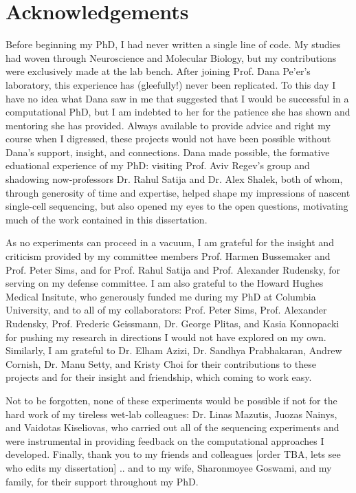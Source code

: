 
\cleartorecto %
\chapter{Acknowledgements} %
\thispagestyle{plain} %

Before beginning my PhD, I had never written a single line of code. 
My studies had woven through Neuroscience and Molecular Biology, but my contributions were exclusively made at the lab bench.  
After joining Prof. Dana Pe'er's laboratory, this experience has (gleefully!) never been replicated. 
To this day I have no idea what Dana saw in me that suggested that I would be successful in a computational PhD, but I am indebted to her for the patience she has shown and mentoring she has provided. 
Always available to provide advice and right my course when I digressed, these projects would not have been possible without Dana's support, insight, and connections.
Dana made possible, the formative eduational experience of my PhD: visiting Prof. Aviv Regev's group and shadowing now-professors Dr. Rahul Satija and Dr. Alex Shalek, both of whom, through generosity of time and expertise, helped shape my impressions of nascent single-cell sequencing, but also opened my eyes to the open questions, motivating much of the work contained in this dissertation. 

As no experiments can proceed in a vacuum, I am grateful for the insight and criticism provided by my committee members Prof. Harmen Bussemaker and Prof. Peter Sims, and for Prof. Rahul Satija and Prof. Alexander Rudensky, for serving on my defense committee.    
I am also grateful to the Howard Hughes Medical Insitute, who generously funded me during my PhD at Columbia University, and to all of my collaborators: Prof. Peter Sims, Prof. Alexander Rudensky, Prof. Frederic Geissmann, Dr. George Plitas, and Kasia Konnopacki for pushing my research in directions I would not have explored on my own.  
Similarly, I am grateful to Dr. Elham Azizi, Dr. Sandhya Prabhakaran, Andrew Cornish, Dr. Manu Setty, and Kristy Choi for their contributions to these projects and for their insight and friendship, which coming to work easy.  

Not to be forgotten, none of these experiments would be possible if not for the hard work of my tireless wet-lab colleagues: Dr. Linas Mazutis, Juozas Nainys, and Vaidotas Kiseliovas, who carried out all of the sequencing experiments and were instrumental in providing feedback on the computational approaches I developed. 
Finally, thank you to my friends and colleagues [order TBA, lets see who edits my dissertation] .. and to my wife, Sharonmoyee Goswami, and my family, for their support throughout my PhD. 
